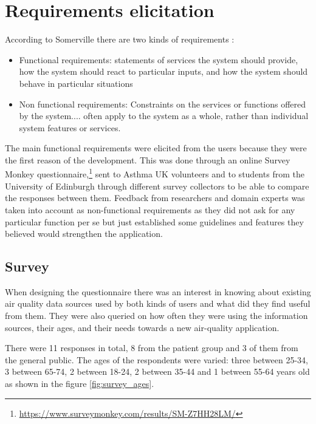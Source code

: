 \section{Requirements elicitation}
According to Somerville there are two kinds of requirements \cite{Sommerville2010}:
\begin{displayquote}
\begin{itemize}

\item Functional requirements: statements of services the system should provide, how the system should react to particular inputs, and how the system should behave in particular situations

\item Non functional requirements: Constraints on the services or functions offered by the system.... often apply to the system as a whole, rather than individual system features or services.


\end{itemize}
\end{displayquote}

The main functional requirements were elicited from the users because they were the first reason of the development. This was done through an online Survey Monkey questionnaire,\footnote{\url{https://www.surveymonkey.com/results/SM-Z7HH28LM/}} sent to Asthma UK volunteers and to students from the University of Edinburgh through different survey collectors to be able to compare the responses between them. Feedback from researchers and domain experts was taken into account as non-functional requirements as they did not ask for any particular function per se but just established some guidelines and features they believed would strengthen the application.

\subsection{Survey}

When designing the questionnaire there was an interest in knowing about existing air quality data sources used by both kinds of users and what did they find useful from them. They were also queried on how often they were using the information sources, their ages, and their needs towards a new air-quality application.

There were 11 responses in total, 8 from the patient group and 3 of them from the general public. The ages of the respondents were varied: three between 25-34, 3 between 65-74, 2 between 18-24, 2 between 35-44 and 1 between 55-64 years old as shown in the figure \ref{fig:survey_ages}. 

